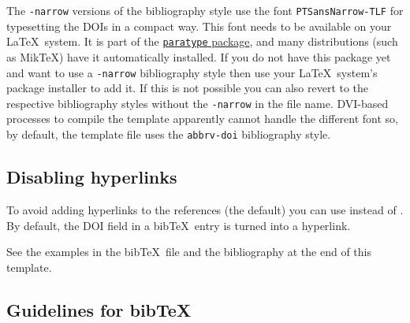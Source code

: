 \documentclass[journal]{vgtc}                %
\begin{document}
The \verb|-narrow| versions of the bibliography style use the font \verb|PTSansNarrow-TLF| for typesetting the DOIs in a compact way.
This font needs to be available on your \LaTeX\ system.
It is part of the \href{https://www.ctan.org/pkg/paratype}{\texttt{paratype} package}, and many distributions (such as MikTeX) have it automatically installed.
If you do not have this package yet and want to use a \verb|-narrow| bibliography style then use your \LaTeX\ system's package installer to add it.
If this is not possible you can also revert to the respective bibliography styles without the \verb|-narrow| in the file name.
DVI-based processes to compile the template apparently cannot handle the different font so, by default, the template file uses the \texttt{abbrv-doi} bibliography style.

\subsection{Disabling hyperlinks}

To avoid adding hyperlinks to the references (the default) you can use \verb|| instead of \verb||.
By default, the DOI field in a bib\TeX\ entry is turned into a hyperlink.

See the examples in the bib\TeX\ file and the bibliography at the end of this template.

\subsection{Guidelines for bibTeX}
\end{document}
